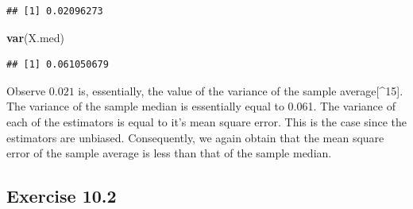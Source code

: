 \documentclass[]{krantz}
\makeatletter
\newenvironment{Shaded}{\begin{snugshade}}{\end{snugshade}}
\newcommand{\KeywordTok}[1]{\textcolor[rgb]{0.13,0.29,0.53}{\textbf{#1}}}
\newcommand{\NormalTok}[1]{#1}
\newenvironment{kframe}{%
\medskip{}
\setlength{\fboxsep}{.8em}
 \def\at@end@of@kframe{}%
 \ifinner\ifhmode%
  \def\at@end@of@kframe{\end{minipage}}%
  \begin{minipage}{\columnwidth}%
 \fi\fi%
 \def\FrameCommand##1{\hskip\@totalleftmargin \hskip-\fboxsep
 \colorbox{shadecolor}{##1}\hskip-\fboxsep
     \hskip-\linewidth \hskip-\@totalleftmargin \hskip\columnwidth}%
 \MakeFramed {\advance\hsize-\width
   \@totalleftmargin\z@ \linewidth\hsize
   \@setminipage}}%
 {\par\unskip\endMakeFramed%
 \at@end@of@kframe}
\renewenvironment{Shaded}{\begin{kframe}}{\end{kframe}}
\theoremstyle{definition}
\theoremstyle{definition}
\theoremstyle{definition}
\theoremstyle{remark}
\makeatother
\begin{document}
\begin{enumerate}
\begin{verbatim}
## [1] 0.02096273
\end{verbatim}

\begin{Shaded}
\begin{Highlighting}[]
\KeywordTok{var}\NormalTok{(X.med)}
\end{Highlighting}
\end{Shaded}

\begin{verbatim}
## [1] 0.061050679
\end{verbatim}

  Observe \(0.021\) is, essentially, the value of the variance of the sample
  average{[}\^{}15{]}. The variance of the sample median is essentially equal to
  0.061. The variance of each of the estimators is equal to it's mean
  square error. This is the case since the estimators are unbiased.
  Consequently, we again obtain that the mean square error of the sample
  average is less than that of the sample median.
\end{enumerate}

\hypertarget{exercise-10.2}{%
\subsection*{Exercise 10.2}\label{exercise-10.2}}
\end{document}

